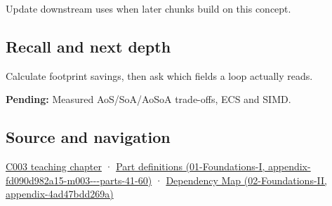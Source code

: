 Update downstream uses when later chunks build on this concept.

\subsection{Recall and next depth}\label{appendix-5522ad176ca0-recall-and-next-depth}

Calculate footprint savings, then ask which fields a loop actually reads.

\textbf{Pending:} Measured AoS/SoA/AoSoA trade-offs, ECS and SIMD.

\subsection{Source and navigation}\label{appendix-5522ad176ca0-source-and-navigation}

\hyperref[05-engine-i-ch002-where-the-bytes-live]{C003 teaching chapter} · \href{../01-Foundations-I/main.pdf\#nameddest=appendix-fd090d982a15-m003---parts-41-60}{Part definitions (01-Foundations-I, appendix-fd090d982a15-m003-\/-\/-parts-41-60)} · \href{../02-Foundations-II/main.pdf\#nameddest=appendix-4ad47bdd269a}{Dependency Map (02-Foundations-II, appendix-4ad47bdd269a)}
